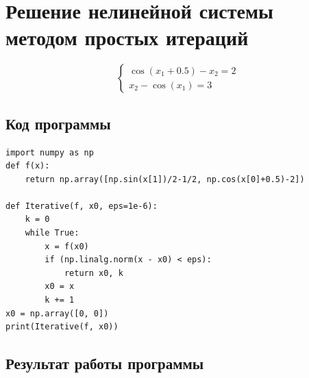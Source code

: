 \documentclass[12pt,a4paper]{article}
\begin{document}
\section{Решение нелинейной системы методом простых итераций}
\begin{displaymath}
\left\{ \begin{array}{ll}
\cos(x_1+0.5)-x_2=2 \\
x_2-\cos(x_1)=3

\end{array} \right.
\end{displaymath}
\subsection{Код программы}
\begin{verbatim}
import numpy as np
def f(x):
    return np.array([np.sin(x[1])/2-1/2, np.cos(x[0]+0.5)-2])

def Iterative(f, x0, eps=1e-6):
    k = 0
    while True:
        x = f(x0)
        if (np.linalg.norm(x - x0) < eps):
            return x0, k
        x0 = x
        k += 1
x0 = np.array([0, 0])
print(Iterative(f, x0))
\end{verbatim}
\subsection{Результат работы программы}
\end{document}
